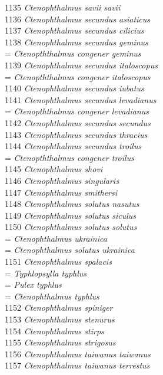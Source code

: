 \documentclass[
]{article}
\begin{document}
1135 \emph{Ctenophthalmus savii savii}\\
1136 \emph{Ctenophthalmus secundus asiaticus}\\
1137 \emph{Ctenophthalmus secundus cilicius}\\
1138 \emph{Ctenophthalmus secundus geminus}\\
= \emph{Ctenopththalmus congener geminus}\\
1139 \emph{Ctenophthalmus secundus italoscopus}\\
= \emph{Ctenopththalmus congener italoscopus}\\
1140 \emph{Ctenophthalmus secundus iubatus}\\
1141 \emph{Ctenophthalmus secundus levadianus}\\
= \emph{Ctenopththalmus congener levadianus}\\
1142 \emph{Ctenophthalmus secundus secundus}\\
1143 \emph{Ctenophthalmus secundus thracius}\\
1144 \emph{Ctenophthalmus secundus troilus}\\
= \emph{Ctenopththalmus congener troilus}\\
1145 \emph{Ctenophthalmus shovi}\\
1146 \emph{Ctenophthalmus singularis}\\
1147 \emph{Ctenophthalmus smithersi}\\
1148 \emph{Ctenophthalmus solutus nasutus}\\
1149 \emph{Ctenophthalmus solutus siculus}\\
1150 \emph{Ctenophthalmus solutus solutus}\\
= \emph{Ctenophthalmus ukrainica}\\
= \emph{Ctenophthalmus solutus ukrainica}\\
1151 \emph{Ctenophthalmus spalacis}\\
= \emph{Typhlopsylla typhlus}\\
= \emph{Pulex typhlus}\\
= \emph{Ctenophthalmus typhlus}\\
1152 \emph{Ctenophthalmus spiniger}\\
1153 \emph{Ctenophthalmus stenurus}\\
1154 \emph{Ctenophthalmus stirps}\\
1155 \emph{Ctenophthalmus strigosus}\\
1156 \emph{Ctenophthalmus taiwanus taiwanus}\\
1157 \emph{Ctenophthalmus taiwanus terrestus}\\
\end{document}
